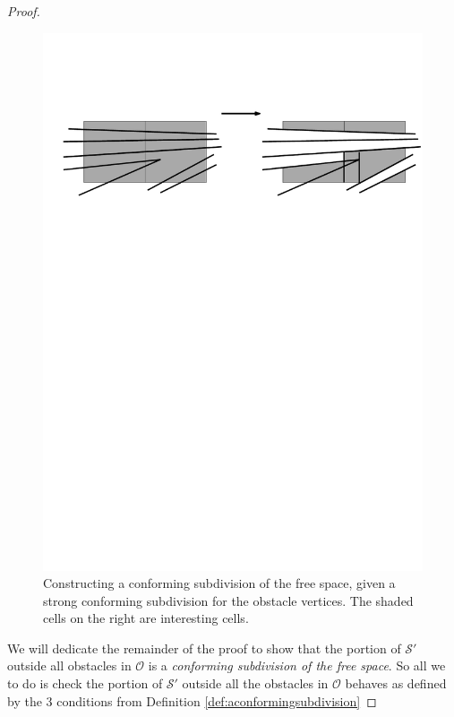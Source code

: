 \begin{proof}
\begin{figure}[H]
	\centering
	\includegraphics[width=\textwidth]{figures/constructingconformingsubdivision.pdf}
	\caption{Constructing a conforming subdivision of the free space, given a strong conforming 
    	 	 subdivision for the obstacle vertices. The shaded cells on the right are interesting 
             cells\cite{HershbergerS99}.}
	\label{fig:constructingconformingsubdivision}
\end{figure}

We will dedicate the remainder of the proof to show that the portion of $\mathcal{S}'$ outside 
all obstacles in $\mathcal{O}$ is a \textit{conforming subdivision of the free space}. So all we
to do is check the portion of $\mathcal{S}'$ outside all the obstacles in $\mathcal{O}$ behaves 
as defined by the 3 conditions from Definition \ref{def:aconformingsubdivision}


\end{proof}
